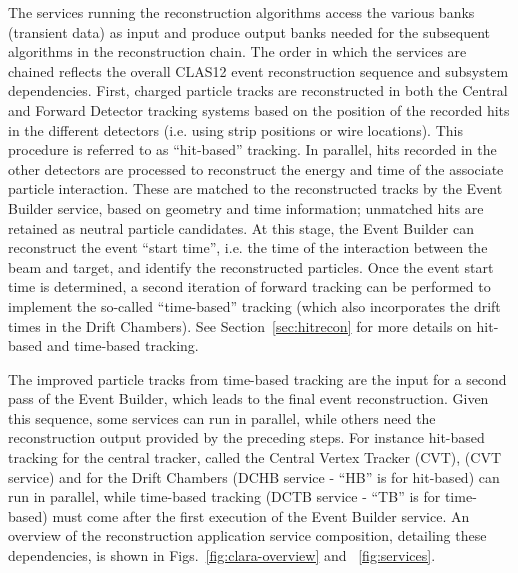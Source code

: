 The services running the reconstruction algorithms access the various banks (transient data) as input and produce
output banks needed for the subsequent algorithms in the reconstruction chain. The order in which the services are
chained reflects the overall CLAS12 event reconstruction sequence and subsystem dependencies. First, charged
particle tracks are reconstructed in both the Central and Forward Detector tracking systems based on the position
of the recorded hits in the different detectors (i.e. using strip positions or wire locations). This procedure is
referred to as ``hit-based'' tracking. In parallel, hits recorded in the other detectors are processed to reconstruct
the energy and time of the associate particle interaction. These are matched to the reconstructed tracks by the
Event Builder service, based on geometry and time information; unmatched hits are retained as neutral particle
candidates. At this stage, the Event Builder can reconstruct the event ``start time'', i.e. the time of the interaction
between the beam and target, and identify the reconstructed particles. Once the event start time is determined, a
second iteration of forward tracking can be performed to implement the so-called ``time-based'' tracking (which
also incorporates the drift times in the Drift Chambers). See Section~\ref{sec:hitrecon} for more details on
hit-based and time-based tracking.

The improved particle tracks from time-based tracking are the input for a second pass of the Event Builder, which
leads to the final event reconstruction. Given this sequence, some services can run in parallel, while others need the
reconstruction output provided by the preceding steps. For instance hit-based tracking for the central tracker, called
the Central Vertex Tracker (CVT), (CVT service) and for the Drift Chambers (DCHB service - ``HB'' is for
hit-based) can run in parallel, while time-based tracking (DCTB service - ``TB'' is for time-based) must come after
the first execution of the Event Builder service. An overview of the reconstruction application service composition,
detailing these dependencies, is shown in Figs.~\ref{fig:clara-overview} and ~\ref{fig:services}.
